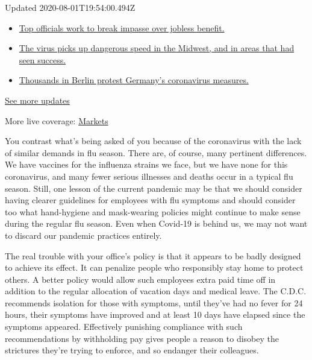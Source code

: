 Updated 2020-08-01T19:54:00.494Z

\begin{itemize}
\tightlist
\item
  \href{https://www.nytimes3xbfgragh.onion/2020/08/01/world/coronavirus-covid-19.html?action=click\&pgtype=Article\&state=default\&region=MAIN_CONTENT_1\&context=storylines_live_updates\#link-3ac56579}{Top
  officials work to break impasse over jobless benefit.}
\item
  \href{https://www.nytimes3xbfgragh.onion/2020/08/01/world/coronavirus-covid-19.html?action=click\&pgtype=Article\&state=default\&region=MAIN_CONTENT_1\&context=storylines_live_updates\#link-8796723}{The
  virus picks up dangerous speed in the Midwest, and in areas that had
  seen success.}
\item
  \href{https://www.nytimes3xbfgragh.onion/2020/08/01/world/coronavirus-covid-19.html?action=click\&pgtype=Article\&state=default\&region=MAIN_CONTENT_1\&context=storylines_live_updates\#link-25930521}{Thousands
  in Berlin protest Germany's coronavirus measures.}
\end{itemize}

\href{https://www.nytimes3xbfgragh.onion/2020/08/01/world/coronavirus-covid-19.html?action=click\&pgtype=Article\&state=default\&region=MAIN_CONTENT_1\&context=storylines_live_updates}{See
more updates}

More live coverage:
\href{https://www.nytimes3xbfgragh.onion/live/2020/07/31/business/stock-market-today-coronavirus?action=click\&pgtype=Article\&state=default\&region=MAIN_CONTENT_1\&context=storylines_live_updates}{Markets}

You contrast what's being asked of you because of the coronavirus with
the lack of similar demands in flu season. There are, of course, many
pertinent differences. We have vaccines for the influenza strains we
face, but we have none for this coronavirus, and many fewer serious
illnesses and deaths occur in a typical flu season. Still, one lesson of
the current pandemic may be that we should consider having clearer
guidelines for employees with flu symptoms and should consider too what
hand-hygiene and mask-wearing policies might continue to make sense
during the regular flu season. Even when Covid-19 is behind us, we may
not want to discard our pandemic practices entirely.

The real trouble with your office's policy is that it appears to be
badly designed to achieve its effect. It can penalize people who
responsibly stay home to protect others. A better policy would allow
such employees extra paid time off in addition to the regular allocation
of vacation days and medical leave. The C.D.C. recommends isolation for
those with symptoms, until they've had no fever for 24 hours, their
symptoms have improved and at least 10 days have elapsed since the
symptoms appeared. Effectively punishing compliance with such
recommendations by withholding pay gives people a reason to disobey the
strictures they're trying to enforce, and so endanger their colleagues.

